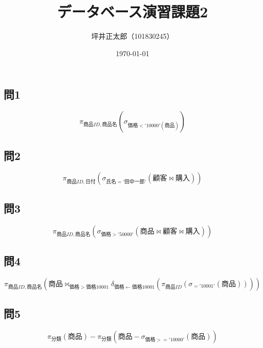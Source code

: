 \documentclass[a4paper,15pt]{jsarticle}
\begin{document}
\title{データベース演習課題2}
\author{坪井正太郎（101830245）}
\date{\today}
\maketitle
\subsection*{問1}
\Large\[\pi _{商品ID, 商品名}(\sigma _{価格<'10000'(商品)})\]

\subsection*{問2}
\Large\[\pi _{商品ID, 日付}(\sigma _{氏名='田中一郎'} (顧客 \Join 購入))\]

\subsection*{問3}
\Large\[\pi _{商品ID, 商品名}(\sigma _{価格>'50000'} (商品 \Join 顧客 \Join 購入))\]

\subsection*{問4}
\Large\[\pi _{商品ID, 商品名}(商品 \Join _{価格>価格10001} \delta _{価格\leftarrow 価格10001}(\pi _{商品ID}(\sigma _{='10001'}(商品))))\]

\subsection*{問5}
\Large\[\pi _{分類}(商品) - \pi _{分類} (商品 - \sigma _{価格>='10000'}(商品))\]
\end{document}
